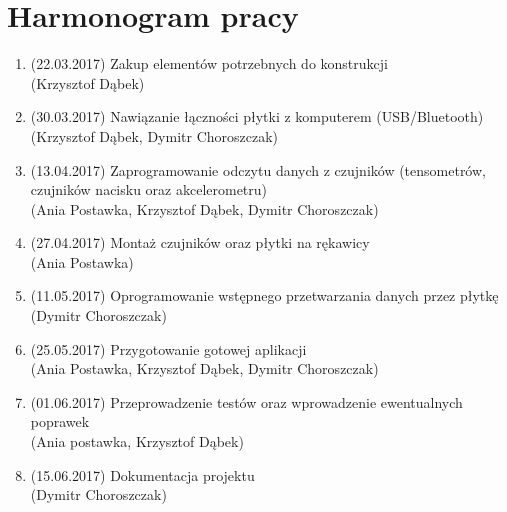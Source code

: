 \documentclass[12pt,a4paper]{article}
\begin{document}
\section{Harmonogram pracy}
\begin{enumerate}
\item (22.03.2017) Zakup elementów potrzebnych do konstrukcji \\(Krzysztof Dąbek)
\item (30.03.2017) Nawiązanie łączności płytki z komputerem (USB/Bluetooth) \\(Krzysztof Dąbek, Dymitr Choroszczak)
\item (13.04.2017) Zaprogramowanie odczytu danych z czujników (tensometrów, czujników nacisku oraz akcelerometru) \\(Ania Postawka, Krzysztof Dąbek, Dymitr Choroszczak) 
\item (27.04.2017) Montaż czujników oraz płytki na rękawicy \\(Ania Postawka)
\item (11.05.2017) Oprogramowanie wstępnego przetwarzania danych przez płytkę \\(Dymitr Choroszczak) 
\item (25.05.2017) Przygotowanie gotowej aplikacji \\(Ania Postawka, Krzysztof Dąbek, Dymitr Choroszczak)
\item (01.06.2017) Przeprowadzenie testów oraz wprowadzenie ewentualnych poprawek \\(Ania postawka, Krzysztof Dąbek)
\item (15.06.2017) Dokumentacja projektu \\(Dymitr Choroszczak)


\end{enumerate}
\end{document}
